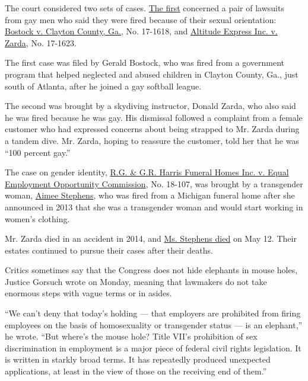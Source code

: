 The court considered two sets of cases.
\href{https://www.supremecourt.gov/oral_arguments/argument_transcripts/2019/17-1618_7k47.pdf}{The
first} concerned a pair of lawsuits from gay men who said they were
fired because of their sexual orientation:
\href{http://www.scotusblog.com/case-files/cases/bostock-v-clayton-county-georgia/}{Bostock
v. Clayton County, Ga.}, No. 17-1618, and
\href{http://www.scotusblog.com/case-files/cases/altitude-express-inc-v-zarda/}{Altitude
Express Inc. v. Zarda}, No. 17-1623.

The first case was filed by Gerald Bostock, who was fired from a
government program that helped neglected and abused children in Clayton
County, Ga., just south of Atlanta, after he joined a gay softball
league.

The second was brought by a skydiving instructor, Donald Zarda, who also
said he was fired because he was gay. His dismissal followed a complaint
from a female customer who had expressed concerns about being strapped
to Mr. Zarda during a tandem dive. Mr. Zarda, hoping to reassure the
customer, told her that he was ``100 percent gay.''

The case on gender identity,
\href{http://www.scotusblog.com/case-files/cases/r-g-g-r-harris-funeral-homes-inc-v-equal-opportunity-employment-commission/}{R.G.
\& G.R. Harris Funeral Homes Inc. v. Equal Employment Opportunity
Commission}, No. 18-107, was brought by a transgender woman,
\href{https://www.nytimes3xbfgragh.onion/2020/05/12/us/aimee-stephens-supreme-court-dead.html}{Aimee
Stephens}, who was fired from a Michigan funeral home after she
announced in 2013 that she was a transgender woman and would start
working in women's clothing.

Mr. Zarda died in an accident in 2014, and
\href{https://www.nytimes3xbfgragh.onion/2020/05/12/us/aimee-stephens-supreme-court-dead.html}{Ms.
Stephens died} on May 12. Their estates continued to pursue their cases
after their deaths.

Critics sometimes say that the Congress does not hide elephants in mouse
holes, Justice Gorsuch wrote on Monday, meaning that lawmakers do not
take enormous steps with vague terms or in asides.

``We can't deny that today's holding --- that employers are prohibited
from firing employees on the basis of homosexuality or transgender
status --- is an elephant,'' he wrote. ``But where's the mouse hole?
Title VII's prohibition of sex discrimination in employment is a major
piece of federal civil rights legislation. It is written in starkly
broad terms. It has repeatedly produced unexpected applications, at
least in the view of those on the receiving end of them.''

